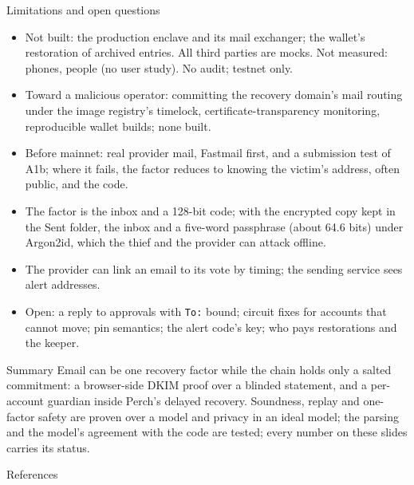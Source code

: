 \documentclass[aspectratio=169,11pt]{beamer}
\begin{document}
\begin{frame}{Limitations and open questions}
  \small
  \begin{itemize}
    \item Not built: the production enclave and its mail exchanger; the
      wallet's restoration of archived entries. All third parties are mocks. Not measured: phones, people (no user study). No
      audit; testnet only.
    \item Toward a malicious operator: committing the recovery domain's mail
      routing under the image registry's timelock, certificate-transparency
      monitoring, reproducible wallet builds; none built.
    \item Before mainnet: real provider mail, Fastmail first, and a
      submission test of A1b; where it fails, the factor reduces to knowing
      the victim's address, often public, and the code.
    \item The factor is the inbox and a 128-bit code; with the encrypted
      copy kept in the Sent folder, the inbox and a five-word passphrase
      (about 64.6 bits) under Argon2id, which the thief and the provider can
      attack offline.
    \item The provider can link an email to its vote by timing; the sending
      service sees alert addresses.
    \item Open: a reply to approvals with \texttt{To:} bound; circuit fixes
      for accounts that cannot move; pin semantics; the alert code's key;
      who pays restorations and the keeper.
  \end{itemize}
\end{frame}

\begin{frame}{Summary}
  Email can be one recovery factor while the chain holds only a salted
  commitment: a browser-side DKIM proof over a blinded statement, and a
  per-account guardian inside Perch's delayed recovery. Soundness, replay and
  one-factor safety are proven over a model and privacy in an ideal model;
  the parsing and the model's agreement with the code are tested; every
  number on these slides carries its status.
\end{frame}

\begin{frame}[allowframebreaks]{References}
  \tiny
  
  
\end{frame}
\end{document}
